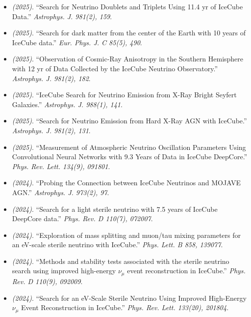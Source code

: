 \begin{itemize}
\item \textit{(2025)}. ``Search for Neutrino Doublets and Triplets Using 11.4 yr of IceCube Data.'' \textit{Astrophys. J. 981(2), 159}.  
\item \textit{(2025)}. ``Search for dark matter from the center of the Earth with 10 years of IceCube data.'' \textit{Eur. Phys. J. C 85(5), 490}.  
\item \textit{(2025)}. ``Observation of Cosmic-Ray Anisotropy in the Southern Hemisphere with 12 yr of Data Collected by the IceCube Neutrino Observatory.'' \textit{Astrophys. J. 981(2), 182}.  
\item \textit{(2025)}. ``IceCube Search for Neutrino Emission from X-Ray Bright Seyfert Galaxies.'' \textit{Astrophys. J. 988(1), 141}.  
\item \textit{(2025)}. ``Search for Neutrino Emission from Hard X-Ray AGN with IceCube.'' \textit{Astrophys. J. 981(2), 131}.  
\item \textit{(2025)}. ``Measurement of Atmospheric Neutrino Oscillation Parameters Using Convolutional Neural Networks with 9.3 Years of Data in IceCube DeepCore.'' \textit{Phys. Rev. Lett. 134(9), 091801}.  
\item \textit{(2024)}. ``Probing the Connection between IceCube Neutrinos and MOJAVE AGN.'' \textit{Astrophys. J. 973(2), 97}.  
\item \textit{(2024)}. ``Search for a light sterile neutrino with 7.5 years of IceCube DeepCore data.'' \textit{Phys. Rev. D 110(7), 072007}.  
\item \textit{(2024)}. ``Exploration of mass splitting and muon/tau mixing parameters for an eV-scale sterile neutrino with IceCube.'' \textit{Phys. Lett. B 858, 139077}.  
\item \textit{(2024)}. ``Methods and stability tests associated with the sterile neutrino search using improved high-energy $\nu_\mu$ event reconstruction in IceCube.'' \textit{Phys. Rev. D 110(9), 092009}.  
\item \textit{(2024)}. ``Search for an eV-Scale Sterile Neutrino Using Improved High-Energy $\nu_\mu$ Event Reconstruction in IceCube.'' \textit{Phys. Rev. Lett. 133(20), 201804}.  

\end{itemize}
